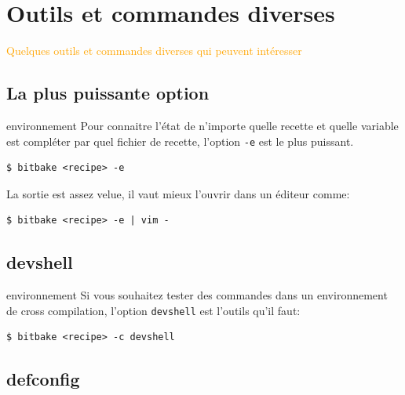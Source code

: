 \documentclass[compress]{beamer}
\begin{document}
\section{Outils et commandes diverses}

\begin{frame}
\end{frame}

\begin{frame}
\begin{center}
\textcolor{orange}{\huge{Quelques outils et commandes diverses qui peuvent intéresser}}
\end{center}
\end{frame}

\subsection{La plus puissante option}

\begin{frame}[fragile]{environnement}
Pour connaitre l'état de n'importe quelle recette et quelle variable est compléter par quel fichier de recette, l'option \texttt{-e} est le plus puissant.\newline
\begin{lstlisting}[style=shell]
$ bitbake <recipe> -e
\end{lstlisting}
La sortie est assez velue, il vaut mieux l'ouvrir dans un éditeur comme:
\begin{lstlisting}[style=shell]
$ bitbake <recipe> -e | vim -
\end{lstlisting}
\end{frame}

\subsection{devshell}

\begin{frame}[fragile]{environnement}
Si vous souhaitez tester des commandes dans un environnement de cross compilation, l'option \texttt{devshell} est l'outils qu'il faut:
\begin{lstlisting}[style=shell]
$ bitbake <recipe> -c devshell
\end{lstlisting}
\end{frame}

\subsection{defconfig}
\end{document}
